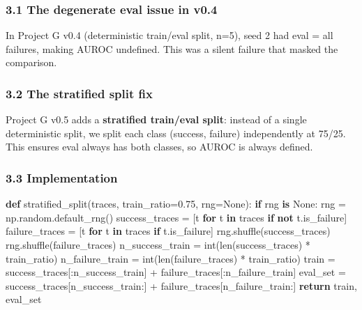 \documentclass[
]{article}
\newenvironment{Shaded}{}{}
\newcommand{\BuiltInTok}[1]{\textcolor[rgb]{0.00,0.50,0.00}{#1}}
\newcommand{\ControlFlowTok}[1]{\textcolor[rgb]{0.00,0.44,0.13}{\textbf{#1}}}
\newcommand{\FloatTok}[1]{\textcolor[rgb]{0.25,0.63,0.44}{#1}}
\newcommand{\KeywordTok}[1]{\textcolor[rgb]{0.00,0.44,0.13}{\textbf{#1}}}
\newcommand{\NormalTok}[1]{#1}
\newcommand{\OperatorTok}[1]{\textcolor[rgb]{0.40,0.40,0.40}{#1}}
\newcommand{\VariableTok}[1]{\textcolor[rgb]{0.10,0.09,0.49}{#1}}
\begin{document}
\subsubsection{3.1 The degenerate eval issue in
v0.4}\label{the-degenerate-eval-issue-in-v0.4}

In Project G v0.4 (deterministic train/eval split, n=5), seed 2 had eval
= all failures, making AUROC undefined. This was a silent failure that
masked the comparison.

\subsubsection{3.2 The stratified split
fix}\label{the-stratified-split-fix}

Project G v0.5 adds a \textbf{stratified train/eval split}: instead of a
single deterministic split, we split each class (success, failure)
independently at 75/25. This ensures eval always has both classes, so
AUROC is always defined.

\subsubsection{3.3 Implementation}\label{implementation}

\begin{Shaded}
\begin{Highlighting}[]
\KeywordTok{def}\NormalTok{ stratified\_split(traces, train\_ratio}\OperatorTok{=}\FloatTok{0.75}\NormalTok{, rng}\OperatorTok{=}\VariableTok{None}\NormalTok{):}
    \ControlFlowTok{if}\NormalTok{ rng }\KeywordTok{is} \VariableTok{None}\NormalTok{:}
\NormalTok{        rng }\OperatorTok{=}\NormalTok{ np.random.default\_rng()}
\NormalTok{    success\_traces }\OperatorTok{=}\NormalTok{ [t }\ControlFlowTok{for}\NormalTok{ t }\KeywordTok{in}\NormalTok{ traces }\ControlFlowTok{if} \KeywordTok{not}\NormalTok{ t.is\_failure]}
\NormalTok{    failure\_traces }\OperatorTok{=}\NormalTok{ [t }\ControlFlowTok{for}\NormalTok{ t }\KeywordTok{in}\NormalTok{ traces }\ControlFlowTok{if}\NormalTok{ t.is\_failure]}
\NormalTok{    rng.shuffle(success\_traces)}
\NormalTok{    rng.shuffle(failure\_traces)}
\NormalTok{    n\_success\_train }\OperatorTok{=} \BuiltInTok{int}\NormalTok{(}\BuiltInTok{len}\NormalTok{(success\_traces) }\OperatorTok{*}\NormalTok{ train\_ratio)}
\NormalTok{    n\_failure\_train }\OperatorTok{=} \BuiltInTok{int}\NormalTok{(}\BuiltInTok{len}\NormalTok{(failure\_traces) }\OperatorTok{*}\NormalTok{ train\_ratio)}
\NormalTok{    train }\OperatorTok{=}\NormalTok{ success\_traces[:n\_success\_train] }\OperatorTok{+}\NormalTok{ failure\_traces[:n\_failure\_train]}
\NormalTok{    eval\_set }\OperatorTok{=}\NormalTok{ success\_traces[n\_success\_train:] }\OperatorTok{+}\NormalTok{ failure\_traces[n\_failure\_train:]}
    \ControlFlowTok{return}\NormalTok{ train, eval\_set}
\end{Highlighting}
\end{Shaded}
\end{document}
